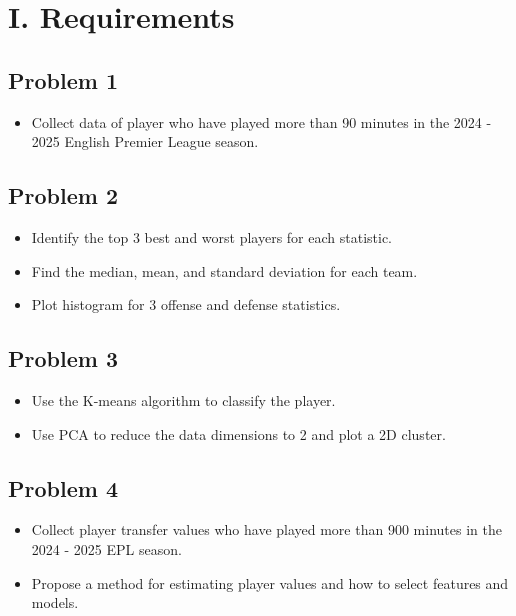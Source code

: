 \documentclass[a4paper,12pt]{article}
\begin{document}
\section*{I. Requirements}
{}
\begin{itemize}[label= {-}, leftmargin= 1cm]
    \subsection*{Problem 1}
        \begin{itemize}[label= {-},  leftmargin= 2cm]
            \item Collect data of player who have played more than 90 minutes in the 2024 - 2025 English Premier League season.
        \end{itemize}

    \subsection*{Problem 2}
        \begin{itemize}[label= {-}, leftmargin= 2cm]
            \item Identify the top 3 best and worst players for each statistic.
            \item  Find the median, mean, and standard deviation for each team.
            \item  Plot histogram for 3 offense and defense statistics.
        \end{itemize}

    \subsection*{Problem 3}
        \begin{itemize}[label= {-}, leftmargin= 2cm]
            \item Use the K-means algorithm to classify the player.
            \item Use PCA to reduce the data dimensions to 2 and plot a 2D cluster.
        \end{itemize}

    \subsection*{Problem 4}
        \begin{itemize}[label= {-}, leftmargin= 2cm]
            \item Collect player transfer values who have played more than 900 minutes in the 2024 - 2025 EPL season.
            \item Propose a method for estimating player values and how to select features and models.
        \end{itemize}

\end{itemize}
\end{document}
